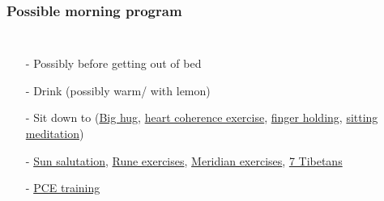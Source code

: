 \begin{frame}
\frametitle{Possible morning program}
\begin{columns}[c] %

\begin{itemize}
\item[-] Possibly \underline{} %
before getting out of bed
\item[-] Drink  (possibly warm/ with lemon)
\item[-] Sit down to  (\underline{Big hug}, %
\underline{heart coherence exercise}, 
\underline{finger holding}, %
\underline{sitting meditation})
\item[-] \underline{Sun salutation}, \underline{Rune exercises}, \underline{Meridian exercises}, %
\underline{7 Tibetans} %
\item[-] \underline{PCE training}
\end{itemize}
\end{columns}
\end{frame}
